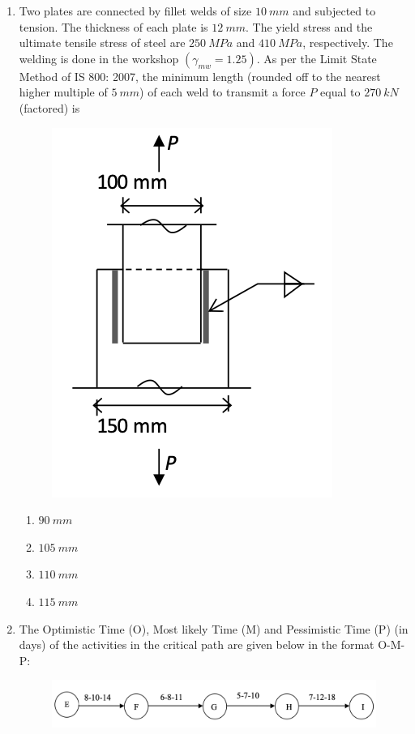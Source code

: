 \documentclass[journal]{IEEEtran}
\begin{document}
\begin{enumerate}[resume]
\item Two plates are connected by fillet welds of size $10 \ mm$ and subjected to tension. The thickness of each plate is $12 \ mm$. The yield stress and the ultimate tensile stress of steel are $250 \ MPa$ and $410 \ MPa$, respectively. The welding is done in the workshop $(\gamma_{mw} = 1.25)$.  
As per the Limit State Method of IS 800: 2007, the minimum length (rounded off to the nearest higher multiple of $5 \ mm$) of each weld to transmit a force $P$ equal to $270 \ kN$ (factored) is  \hfill {}

\begin{figure}[H]
    \centering
    \includegraphics[width=0.6\columnwidth]{figs/Q48.png} 
    \caption{}
    \label{fig:placeholder}
\end{figure}

\begin{enumerate}
    \item $90 \ mm$
    \item $105 \ mm$
    \item $110 \ mm$
    \item $115 \ mm$
\end{enumerate}

\item The Optimistic Time (O), Most likely Time (M) and Pessimistic Time (P) (in days) of the activities in the critical path are given below in the format O-M-P:  

\begin{figure}[H]
    \centering
    \includegraphics[width=0.6\columnwidth]{figs/Q49.png} 
    \caption{}
    \label{fig:placeholder}
\end{figure}


\end{enumerate}
\end{document}
